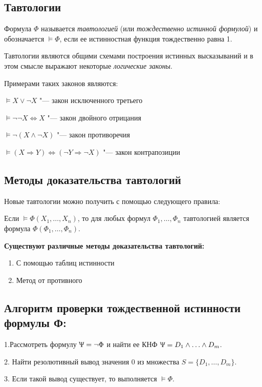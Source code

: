 \subsection*{Тавтологии}
\begin{definition}
    Формула $\Phi$ называется \textit{тавтологией} (или \textit{тождественно истинной формулой}) и обозначается $\vDash\Phi$, если ее истинностная функция тождественно равна 1.
\end{definition}

Тавтологии являются общими схемами построения истинных высказываний и в этом смысле выражают некоторые \textit{логические законы}.

Примерами таких законов являются:

$\vDash X \lor \lnot X$ "--- закон исключенного третьего

$\vDash\lnot\lnot X \Leftrightarrow X$ "--- закон двойного отрицания

$\vDash\lnot(X \land \lnot X)$ "--- закон противоречия

$\vDash(X\Rightarrow Y) \Leftrightarrow (\lnot Y \Rightarrow \lnot X)$ "--- закон контрапозиции

\subsection*{Методы доказательства тавтологий}
Новые тавтологии можно получить с помощью следующего правила:
\begin{theorem}
    Если $\vDash \Phi (X_1,\dots,X_n)$, то для любых формул $\Phi_1,\dots,\Phi_n$ тавтологией является формула $\Phi(\Phi_1,\dots,\Phi_n)$.
\end{theorem}

\textbf{Существуют различные методы доказательства тавтологий:}
\begin{enumerate}
    \item С помощью таблиц истинности
    \item Метод от противного
\end{enumerate}

\subsection*{Алгоритм проверки тождественной истинности формулы Ф:}
1.Рассмотреть формулу $\Uppsi=\lnot \Phi$ и найти ее КНФ $\Uppsi = D_1\land\ldots\land D_m$.

2. Найти резолютивный вывод значения 0 из множества $S = \{D_1,\ldots,D_m\}$.

3. Если такой вывод существует, то выполняется $\models\Phi$.
